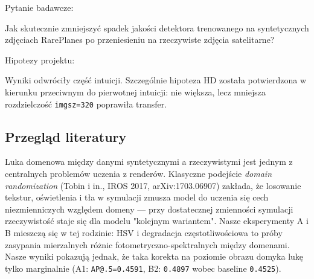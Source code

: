 \documentclass[
  11pt,
]{article}
\newenvironment{Shaded}{}{}
\newcommand{\NormalTok}[1]{#1}
\begin{document}
Pytanie badawcze:

\begin{Shaded}
\begin{Highlighting}[]
\NormalTok{Jak skutecznie zmniejszyć spadek jakości detektora trenowanego na syntetycznych}
\NormalTok{zdjęciach RarePlanes po przeniesieniu na rzeczywiste zdjęcia satelitarne?}
\end{Highlighting}
\end{Shaded}

Hipotezy projektu:

\begingroup
{}
\noindent{}
\endgroup


Wyniki odwróciły część intuicji. Szczególnie hipoteza HD została
potwierdzona w kierunku przeciwnym do pierwotnej intuicji: nie większa,
lecz mniejsza rozdzielczość \texttt{imgsz=320} poprawiła transfer.

\hypertarget{przeglux105d-literatury}{%
\subsection{Przegląd literatury}\label{przeglux105d-literatury}}

Luka domenowa między danymi syntetycznymi a rzeczywistymi jest jednym z
centralnych problemów uczenia z renderów. Klasyczne podejście
\emph{domain randomization} (Tobin i in., IROS 2017, arXiv:1703.06907)
zakłada, że losowanie tekstur, oświetlenia i tła w symulacji zmusza
model do uczenia się cech niezmienniczych względem domeny --- przy
dostatecznej zmienności symulacji rzeczywistość staje się dla modelu
"kolejnym wariantem". Nasze eksperymenty A i B mieszczą się w tej
rodzinie: HSV i degradacja częstotliwościowa to próby zasypania
mierzalnych różnic fotometryczno-spektralnych między domenami. Nasze
wyniki pokazują jednak, że taka korekta na poziomie obrazu domyka lukę
tylko marginalnie (A1: \texttt{AP@.5=0.4591}, B2: \texttt{0.4897} wobec
baseline \texttt{0.4525}).
\end{document}
